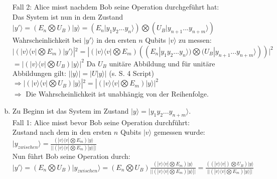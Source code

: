 \documentclass[a4paper]{scrartcl}
\begin{document}
\begin{enumerate}[a)]
\noindent Fall 2: Alice misst nachdem Bob seine Operation durchgeführt hat:\\
Das System ist nun in dem Zustand $|y'\rangle = (E_n\bigotimes U_B)|y\rangle = (E_n|y_1y_2...y_n\rangle)\bigotimes(U_B|y_{n+1}...y_{n+m}\rangle)$\\
Wahrscheinlichkeit bei $|y'\rangle$ in den ersten $n$ Qubits $|v\rangle$ zu messen:\\
$|(|v\rangle \langle v|\bigotimes E_m)|y'\rangle|^2= |(|v\rangle \langle v|\bigotimes E_m)((E_n|y_1y_2...y_n\rangle)\bigotimes(U_B|y_{n+1}...y_{n+m}\rangle))|^2$\\
$=|(|v\rangle \langle v|\bigotimes U_B) |y\rangle|^2$ Da $U_B$ unitäre Abbildung und für unitäre Abbildungen gilt: $| |y\rangle | = |U |y\rangle|$ (s. S. 4 Script)\\
$\Rightarrow  |(|v\rangle \langle v|\bigotimes U_B) |y\rangle|^2 = |(|v\rangle \langle v|\bigotimes E_m) |y\rangle|^2$\\
$\Rightarrow$ Die Wahrscheinlichkeit ist unabhängig von der Reihenfolge.\\

\item Zu Beginn ist das System im Zustand $|y\rangle =|y_1y_2...y_{n+m}\rangle$. \\
Fall 1: Alice misst bevor Bob seine Operation durchführt:\\
Zustand nach dem in den ersten $n$ Qubits $|v\rangle$ gemessen wurde: $|y_{zwischen}\rangle= \frac{(|v\rangle\langle v|\bigotimes E_m)|y\rangle}{||(|v\rangle\langle v|\bigotimes E_m)|y\rangle||}$\\
Nun führt Bob seine Operation durch:\\
$|y'\rangle = (E_n\bigotimes U_B)|y_{zwischen}\rangle= (E_n\bigotimes U_B)\frac{(|v\rangle\langle v|\bigotimes E_m)|y\rangle}{||(|v\rangle\langle v|\bigotimes E_m)|y\rangle||}= \frac{((|v\rangle\langle v|)\bigotimes U_B)|y\rangle}{||(|v\rangle\langle v|\bigotimes E_m)|y\rangle||}$\\


\end{enumerate}
\end{document}
